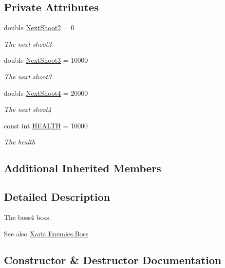 \subsection*{Private Attributes}
\begin{DoxyCompactItemize}
\item 
double \hyperlink{classXaria_1_1Enemies_1_1Boss4_af92b758d15b1f59fe9f1c388649a1f0b}{Next\+Shoot2} = 0
\begin{DoxyCompactList}\small\item\em The next shoot2 \end{DoxyCompactList}\item 
double \hyperlink{classXaria_1_1Enemies_1_1Boss4_aa30f5b106dab98126feaac2bf334ec94}{Next\+Shoot3} = 10000
\begin{DoxyCompactList}\small\item\em The next shoot3 \end{DoxyCompactList}\item 
double \hyperlink{classXaria_1_1Enemies_1_1Boss4_ac49f9eb21a04f4866f0fada986c14be1}{Next\+Shoot4} = 20000
\begin{DoxyCompactList}\small\item\em The next shoot4 \end{DoxyCompactList}\item 
const int \hyperlink{classXaria_1_1Enemies_1_1Boss4_a68cfc0ca9bc301b4085c8b9de57de5f3}{H\+E\+A\+L\+TH} = 10000
\begin{DoxyCompactList}\small\item\em The health \end{DoxyCompactList}\end{DoxyCompactItemize}
\subsection*{Additional Inherited Members}


\subsection{Detailed Description}
The boss4 boss. 

\begin{DoxySeeAlso}{See also}
\hyperlink{classXaria_1_1Enemies_1_1Boss}{Xaria.\+Enemies.\+Boss}


\end{DoxySeeAlso}


\subsection{Constructor \& Destructor Documentation}
\mbox{\label{classXaria_1_1Enemies_1_1Boss4_a901cd427346d2eb5bb199079d3da988c}} 

